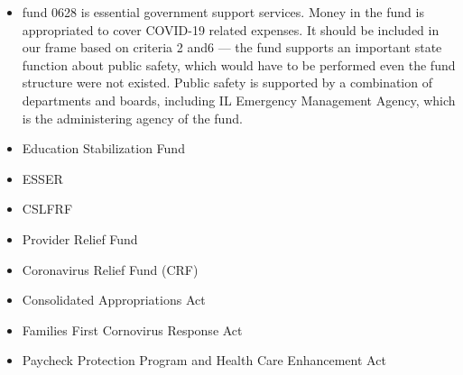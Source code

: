 \documentclass[
  letterpaper,
  DIV=11,
  numbers=noendperiod]{scrreport}
\begin{document}
\begin{itemize}
\item
  fund 0628 is essential government support services. Money in the fund
  is appropriated to cover COVID-19 related expenses. It should be
  included in our frame based on criteria 2 and6 --- the fund supports
  an important state function about public safety, which would have to
  be performed even the fund structure were not existed. Public safety
  is supported by a combination of departments and boards, including IL
  Emergency Management Agency, which is the administering agency of the
  fund.
\item
  Education Stabilization Fund\\
\item
  ESSER
\item
  CSLFRF
\item
  Provider Relief Fund
\item
  Coronavirus Relief Fund (CRF)
\item
  Consolidated Appropriations Act
\item
  Families First Cornovirus Response Act
\item
  Paycheck Protection Program and Health Care Enhancement Act
\end{itemize}
\end{document}
